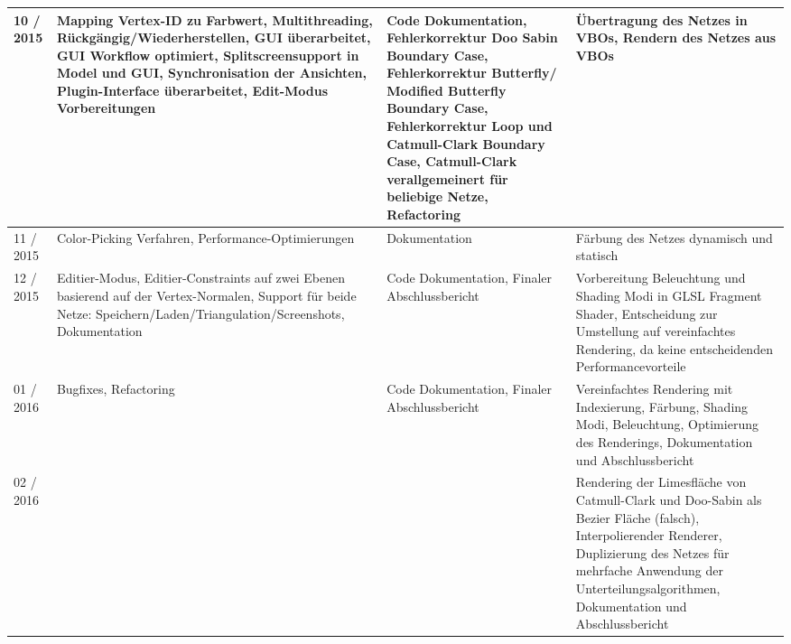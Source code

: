 \begin{table}[]
\begin{tabular}{|p{1.6cm}|p{5cm}|p{5cm}|p{5cm}|}
\hline

10 / 2015 & Mapping Vertex-ID zu Farbwert,
			Multithreading, Rückgängig/Wiederherstellen,
			GUI überarbeitet, GUI Workflow optimiert,
			Splitscreensupport in Model und GUI,
			Synchronisation der Ansichten,
			Plugin-Interface überarbeitet,
			Edit-Modus Vorbereitungen
		  & Code Dokumentation, Fehlerkorrektur Doo Sabin Boundary Case,
		    Fehlerkorrektur Butterfly/ Modified Butterfly Boundary Case,
		    Fehlerkorrektur Loop und Catmull-Clark Boundary Case,
		    Catmull-Clark verallgemeinert für beliebige Netze, Refactoring
		  & Übertragung des Netzes in VBOs,
			Rendern des Netzes aus VBOs
		  \\
		  
\hline

11 / 2015 & Color-Picking Verfahren,
			Performance-Optimierungen
		  & Dokumentation
		  & Färbung des Netzes dynamisch und statisch
		  \\
		  
\hline

12 / 2015 & Editier-Modus, Editier-Constraints
			auf zwei Ebenen basierend auf der
			Vertex-Normalen, Support für beide
			Netze: Speichern/Laden/Triangulation/Screenshots,
			Dokumentation
		  & Code Dokumentation, Finaler Abschlussbericht
		  & Vorbereitung Beleuchtung und Shading Modi in GLSL
		    Fragment Shader, Entscheidung zur Umstellung auf
		    vereinfachtes Rendering, da keine entscheidenden
		    Performancevorteile
		  \\   

\hline

01 / 2016 & Bugfixes, Refactoring
		  & Code Dokumentation, Finaler Abschlussbericht
		  & Vereinfachtes Rendering mit Indexierung,
			Färbung, Shading Modi, Beleuchtung,
			Optimierung des Renderings,
			Dokumentation und Abschlussbericht
		  \\    
		  
\hline

02 / 2016 &
		  &
		  & Rendering der Limesfläche von Catmull-Clark und Doo-Sabin
		    als Bezier Fläche (falsch),
		    Interpolierender Renderer,
		    Duplizierung des Netzes für mehrfache
		    Anwendung der Unterteilungsalgorithmen,
		    Dokumentation und Abschlussbericht
		  \\  
		  
\hline   
		               
\end{tabular}
\label{tab:verlauf}
\end{table}

